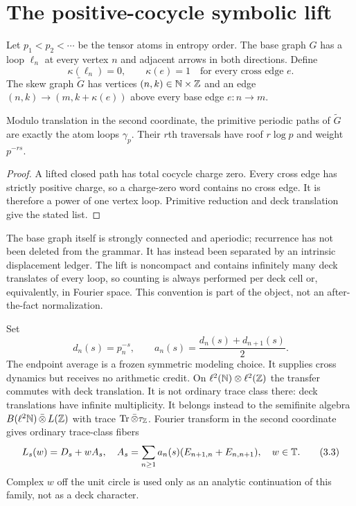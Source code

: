 \section{The positive-cocycle symbolic lift}

Let $p_1<p_2<\cdots$ be the tensor atoms in entropy order.  The base graph
$G$ has a loop $\ell_n$ at every vertex $n$ and adjacent arrows in both
directions.  Define
\[
 \kappa(\ell_n)=0,\qquad \kappa(e)=1
 \quad\text{for every cross edge }e.                   \tag{3.1}
\]
The skew graph $\widetilde G$ has vertices $(n,k)\in\mathbb N\times\mathbb Z$ and an
edge $(n,k)\to(m,k+\kappa(e))$ above every base edge $e:n\to m$.

\begin{theorem}
\label{thm:lift-ledger}
Modulo translation in the second coordinate, the primitive periodic paths of
$\widetilde G$ are exactly the atom loops $\gamma_p$.  Their $r$th traversals
have roof $r\log p$ and weight $p^{-rs}$.
\end{theorem}
\begin{proof}
A lifted closed path has total cocycle charge zero.  Every cross edge has
strictly positive charge, so a charge-zero word contains no cross edge.  It is
therefore a power of one vertex loop.  Primitive reduction and deck
translation give the stated list.
\end{proof}

The base graph itself is strongly connected and aperiodic; recurrence has not
been deleted from the grammar.  It has instead been separated by an intrinsic
displacement ledger.  The lift is noncompact and contains infinitely many
deck translates of every loop, so counting is always performed per deck cell
or, equivalently, in Fourier space.  This convention is part of the object,
not an after-the-fact normalization.

Set
\[
 d_n(s)=p_n^{-s},\qquad
 a_n(s)=\frac{d_n(s)+d_{n+1}(s)}2.                     \tag{3.2}
\]
The endpoint average is a frozen symmetric modeling choice.  It supplies
cross dynamics but receives no arithmetic credit.  On
$\ell^2(\mathbb N)\otimes\ell^2(\mathbb Z)$ the transfer commutes with deck translation.
It is not ordinary trace class there: deck translations have infinite
multiplicity.  It belongs instead to the semifinite algebra
$B(\ell^2\mathbb N)\,\bar\otimes\,L(\mathbb Z)$ with trace
$\operatorname{Tr}\bar\otimes\tau_{\mathbb Z}$.  Fourier transform in the second coordinate gives
ordinary trace-class fibers
\[
 L_s(w)=D_s+wA_s,\quad
 A_s=\sum_{n\ge1}a_n(s)
 (E_{n+1,n}+E_{n,n+1}),\quad w\in\mathbb T.                \tag{3.3}
\]
Complex $w$ off the unit circle is used only as an analytic continuation of
this family, not as a deck character.

